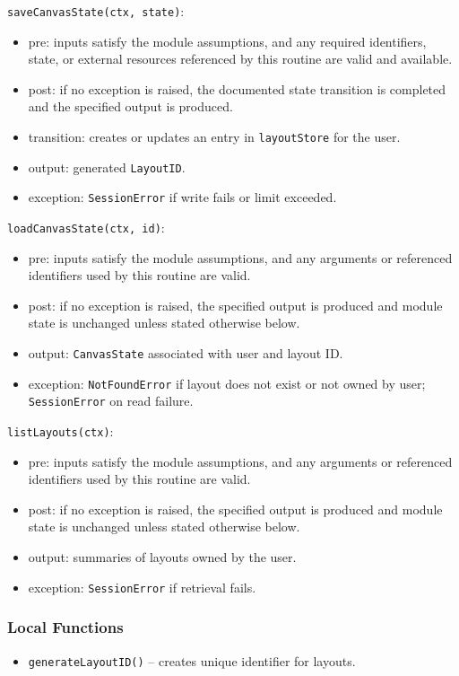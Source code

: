 \documentclass[12pt, titlepage]{article}
\begin{document}
\noindent \texttt{saveCanvasState(ctx, state)}:
\begin{itemize}
    \item pre: inputs satisfy the module assumptions, and any required identifiers, state, or external resources referenced by this routine are valid and available.
    \item post: if no exception is raised, the documented state transition is completed and the specified output is produced.
    \item transition: creates or updates an entry in \texttt{layoutStore} for the user.
    \item output: generated \texttt{LayoutID}.
    \item exception: \texttt{SessionError} if write fails or limit exceeded.
\end{itemize}

\noindent \texttt{loadCanvasState(ctx, id)}:
\begin{itemize}
    \item pre: inputs satisfy the module assumptions, and any arguments or referenced identifiers used by this routine are valid.
    \item post: if no exception is raised, the specified output is produced and module state is unchanged unless stated otherwise below.
    \item output: \texttt{CanvasState} associated with user and layout ID.
    \item exception: \texttt{NotFoundError} if layout does not exist or not owned by user; \texttt{SessionError} on read failure.
\end{itemize}

\noindent \texttt{listLayouts(ctx)}:
\begin{itemize}
    \item pre: inputs satisfy the module assumptions, and any arguments or referenced identifiers used by this routine are valid.
    \item post: if no exception is raised, the specified output is produced and module state is unchanged unless stated otherwise below.
    \item output: summaries of layouts owned by the user.
    \item exception: \texttt{SessionError} if retrieval fails.
\end{itemize}

\subsubsection{Local Functions}
\begin{itemize}
    \item \texttt{generateLayoutID()} – creates unique identifier for layouts.
\end{itemize}
\end{document}
